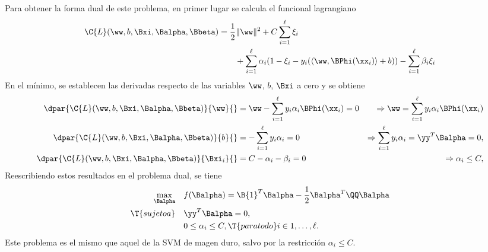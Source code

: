 



Para obtener la forma dual de este problema, en primer lugar se
calcula el funcional lagrangiano
%
\begin{equation}
  \begin{aligned}
  \C{L}(\ww,b,\Bxi,\Balpha,\Bbeta) &= \frac{1}{2} \|\ww\|^2 + C \sum_{i=1}^{\ell} \xi_i \\
  &\quad\quad + \sum_{i=1}^{\ell} \alpha_i (1-\xi_i-y_i(\langle\ww,\BPhi(\xx_i)\rangle+b)) - \sum_{i=1}^{\ell} \beta_i\xi_i
  \end{aligned}
\end{equation}
%
En el mínimo, se establecen las derivadas respecto de las variables
$\ww$, $b$, $\Bxi$ a cero y se obtiene
%
\begin{align}
  \dpar{ \C{L}(\ww,b,\Bxi,\Balpha,\Bbeta)}{\ww}{}
    &=\ww-\sum_{i=1}^\ell y_i\alpha_i\BPhi(\xx_i) = 0
    &\Rightarrow \ww = \sum_{i=1}^\ell y_i\alpha_i\BPhi(\xx_i)
  \\
  \dpar{ \C{L}(\ww,b,\Bxi,\Balpha,\Bbeta)}{b}{}
    &=-\sum_{i=1}^\ell y_i\alpha_i = 0
    &\Rightarrow \sum_{i=1}^\ell y_i\alpha_i = \yy^T\Balpha = 0,\\
  \dpar{ \C{L}(\ww,b,\Bxi,\Balpha,\Bbeta)}{\Bxi_i}{}
    &=C-\alpha_i-\beta_i = 0
    &\Rightarrow \alpha_i \leq C,
\end{align}
%
Reescribiendo estos resultados en el problema dual, se tiene
%
\begin{equation}
\begin{aligned}\label{svmprob-dual-soft}
    \max_{\Balpha} \quad
    & f(\Balpha) = \B{1}^T\Balpha-\frac{1}{2}\Balpha^T\QQ\Balpha\\
    \T{sujeto a}\quad & \yy^T\Balpha = 0, \\
                      & 0\leq\alpha_i\leq C, \T{ para todo } i\in {1,\ldots,\ell }.
\end{aligned}\end{equation}
%
Este problema es el mismo que aquel de la SVM de magen duro, salvo por
la restricción $\alpha_i\leq C$.

